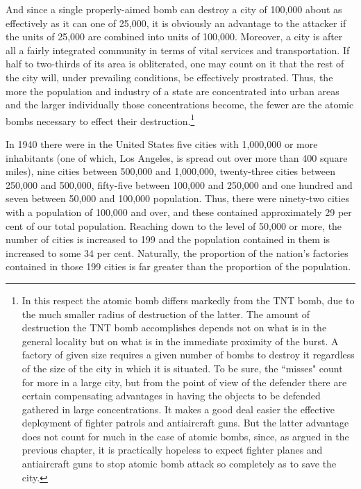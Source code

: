 And since a single properly-aimed bomb can destroy a city of 100,000 about as effectively as it can one of 25,000, it is obviously an advantage to the attacker if the units of 25,000 are combined into units of 100,000. Moreover, a city is after all a fairly integrated community in terms of vital services and transportation. If half to two-thirds of its area is obliterated, one may count on it that the rest of the city will, under prevailing conditions, be effectively prostrated. Thus, the more the population and industry of a state are concentrated into urban areas and the larger individually those concentrations become, the fewer are the atomic bombs necessary to effect their destruction.\footnote{In this respect the atomic bomb differs markedly from the TNT bomb, due to the much smaller radius of destruction of the latter. The amount of destruction the TNT bomb accomplishes depends not on what is in the general locality but on what is in the immediate proximity of the burst. A factory of given size requires a given number of bombs to destroy it regardless of the size of the city in which it is situated. To be sure, the ``misses" count for more in a large city, but from the point of view of the defender there are certain compensating advantages in having the objects to be defended gathered in large concentrations. It makes a good deal easier the effective deployment of fighter patrols and antiaircraft guns. But the latter advantage does not count for much in the case of atomic bombs, since, as argued in the previous chapter, it is practically hopeless to expect fighter planes and antiaircraft guns to stop atomic bomb attack so completely as to save the city.}

In 1940 there were in the United States five cities with 1,000,000 or more inhabitants (one of which, Los Angeles, is spread out over more than 400 square miles), nine cities between 500,000 and 1,000,000, twenty-three cities between 250,000 and 500,000, fifty-five between 100,000 and 250,000 and one hundred and seven between 50,000 and 100,000 population. Thus, there were ninety-two cities with a population of 100,000 and over, and these contained approximately 29 per cent of our total population. Reaching down to the level of 50,000 or more, the number of cities is increased to 199 and the population contained in them is increased to some 34 per cent. Naturally, the proportion of the nation's factories contained in those 199 cities is far greater than the proportion of the population.

